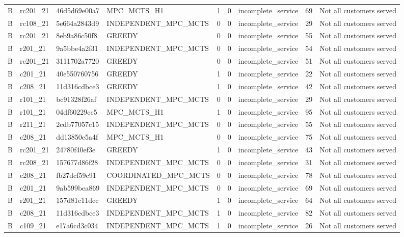 \begin{table}
{\begin{tabular}{llllrrlrl}
B & rc201\_21 & 46d5d69e00a7 & MPC\_MCTS\_H1 & 1 & 0 & incomplete\_service & 69 & Not all customers served \\
B & rc108\_21 & 5e664a2843d9 & INDEPENDENT\_MPC\_MCTS & 0 & 0 & incomplete\_service & 29 & Not all customers served \\
B & rc201\_21 & 8eb9a86c50f8 & GREEDY & 0 & 0 & incomplete\_service & 55 & Not all customers served \\
B & r201\_21 & 9a5bbe4a2f31 & INDEPENDENT\_MPC\_MCTS & 0 & 0 & incomplete\_service & 54 & Not all customers served \\
B & rc201\_21 & 3111702a7720 & GREEDY & 0 & 0 & incomplete\_service & 51 & Not all customers served \\
B & c201\_21 & 40e550760756 & GREEDY & 1 & 0 & incomplete\_service & 22 & Not all customers served \\
B & c208\_21 & 11d316cdbce3 & GREEDY & 1 & 0 & incomplete\_service & 42 & Not all customers served \\
B & r101\_21 & bc91328f26af & INDEPENDENT\_MPC\_MCTS & 0 & 0 & incomplete\_service & 29 & Not all customers served \\
B & r101\_21 & 04df60229cc5 & MPC\_MCTS\_H1 & 1 & 0 & incomplete\_service & 95 & Not all customers served \\
B & r211\_21 & 2cdb77057c15 & INDEPENDENT\_MPC\_MCTS & 0 & 0 & incomplete\_service & 55 & Not all customers served \\
B & c208\_21 & dd13850e5a4f & MPC\_MCTS\_H1 & 0 & 0 & incomplete\_service & 75 & Not all customers served \\
B & rc201\_21 & 24780f40ef3e & GREEDY & 1 & 0 & incomplete\_service & 43 & Not all customers served \\
B & rc208\_21 & 157677d86f28 & INDEPENDENT\_MPC\_MCTS & 0 & 0 & incomplete\_service & 31 & Not all customers served \\
B & c208\_21 & fb27dcf59c91 & COORDINATED\_MPC\_MCTS & 0 & 0 & incomplete\_service & 78 & Not all customers served \\
B & c201\_21 & 9ab599bea869 & INDEPENDENT\_MPC\_MCTS & 0 & 0 & incomplete\_service & 69 & Not all customers served \\
B & r201\_21 & 157d81c11dcc & GREEDY & 1 & 0 & incomplete\_service & 64 & Not all customers served \\
B & c208\_21 & 11d316cdbce3 & INDEPENDENT\_MPC\_MCTS & 1 & 0 & incomplete\_service & 82 & Not all customers served \\
B & c109\_21 & e17a6cd3c034 & INDEPENDENT\_MPC\_MCTS & 1 & 0 & incomplete\_service & 26 & Not all customers served \\

\end{tabular}}
\end{table}
